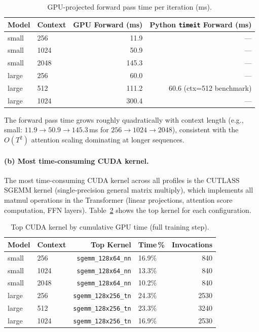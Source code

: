 \documentclass[11pt]{article}
\begin{document}
\begin{table}[H]
\centering
\caption{GPU-projected forward pass time per iteration (ms).}
\label{tab:nsys-forward}
\begin{tabular}{llrr}
  \toprule
  Model & Context & GPU Forward (ms) & Python \texttt{timeit} Forward (ms) \\
  \midrule
  small & 256  &  11.9 & --- \\
  small & 1024 &  50.9 & --- \\
  small & 2048 & 145.3 & --- \\
  \midrule
  large & 256  &  60.0 & --- \\
  large & 512  & 111.2 & 60.6 (ctx=512 benchmark) \\
  large & 1024 & 300.4 & --- \\
  \bottomrule
\end{tabular}
\end{table}

The forward pass time grows roughly quadratically with context length
(e.g., small: $11.9 \to 50.9 \to 145.3$\,ms for $256 \to 1024 \to 2048$),
consistent with the $O(T^2)$ attention scaling dominating at longer sequences.

\paragraph{(b) Most time-consuming CUDA kernel.}

The most time-consuming CUDA kernel across all profiles is the
CUTLASS SGEMM kernel (single-precision general matrix multiply),
which implements all matmul operations in the Transformer (linear
projections, attention score computation, FFN layers).
Table~\ref{tab:nsys-top-kernels} shows the top kernel for each configuration.

\begin{table}[H]
\centering
\caption{Top CUDA kernel by cumulative GPU time (full training step).}
\label{tab:nsys-top-kernels}
\begin{tabular}{llrlr}
  \toprule
  Model & Context & Top Kernel & Time\,\% & Invocations \\
  \midrule
  small & 256  & \texttt{sgemm\_128x64\_nn} & 16.9\% & 840 \\
  small & 1024 & \texttt{sgemm\_128x64\_nn} & 13.3\% & 840 \\
  small & 2048 & \texttt{sgemm\_128x64\_nn} & 10.2\% & 840 \\
  \midrule
  large & 256  & \texttt{sgemm\_128x256\_tn} & 24.3\% & 2530 \\
  large & 512  & \texttt{sgemm\_128x256\_tn} & 23.3\% & 3240 \\
  large & 1024 & \texttt{sgemm\_128x256\_tn} & 16.9\% & 2530 \\
  \bottomrule
\end{tabular}
\end{table}
\end{document}
